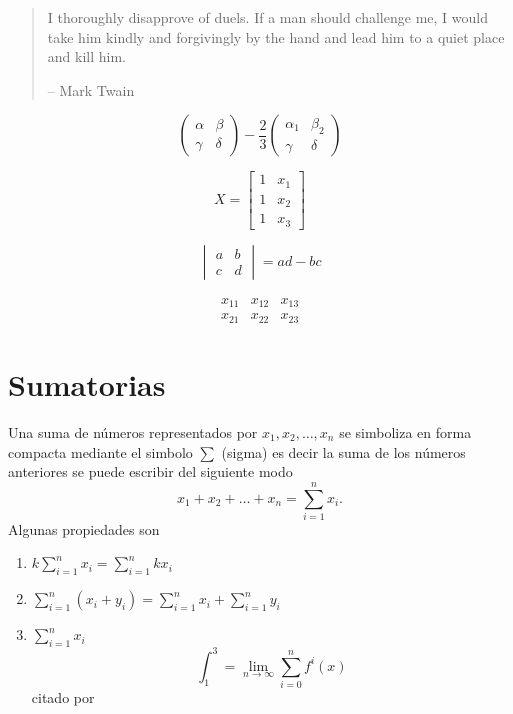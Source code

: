 \documentclass[10pt,]{krantz}
\providecommand{\tightlist}{%
  \setlength{\itemsep}{0pt}\setlength{\parskip}{0pt}}
\theoremstyle{definition}
\theoremstyle{definition}
\theoremstyle{definition}
\theoremstyle{remark}
\begin{document}
\begin{quote}
I thoroughly disapprove of duels. If a man should challenge me,
I would take him kindly and forgivingly by the hand and lead him
to a quiet place and kill him.

-- Mark Twain
\end{quote}

\[\begin{pmatrix}\alpha & \beta\\
\gamma & \delta
\end{pmatrix}-\frac{2}{3} \begin{pmatrix}\alpha_1 & \beta_2\\
\gamma & \delta
\end{pmatrix}\]

\[X = \begin{bmatrix}1 & x_{1}\\
1 & x_{2}\\
1 & x_{3}
\end{bmatrix}\]

\[\begin{vmatrix}a & b\\
c & d
\end{vmatrix}=ad-bc\]

\[\begin{array}{ccc}
x_{11} & x_{12} & x_{13}\\
x_{21} & x_{22} & x_{23}
\end{array}\]

\hypertarget{appendix-apendice}{%
\appendix {}}


\hypertarget{sumatorias}{%
\chapter{Sumatorias}\label{sumatorias}}

Una suma de números representados por \(x_1, x_2, \ldots, x_n\) se simboliza en forma compacta mediante el simbolo \(\sum\) (sigma) es decir la suma de los números anteriores se puede escribir del siguiente modo \[x_1+x_2+\dots+x_n=\sum_{i=1}^nx_i.\]
Algunas propiedades son

\begin{enumerate}
\def\labelenumi{\arabic{enumi}.}
\tightlist
\item
  \(k\sum_{i=1}^nx_i=\sum_{i=1}^nkx_i\)
\item
  \(\sum_{i=1}^n\left(x_i+y_i\right)=\sum_{i=1}^nx_i+\sum_{i=1}^ny_i\)
\item
  \(\sum_{i=1}^nx_i\)
  \[\int_1^3=\lim_{n\to \infty}\sum_{i=0}^{n}f^i(x)\]
  citado por \citep{xie2015}
\end{enumerate}
\end{document}
